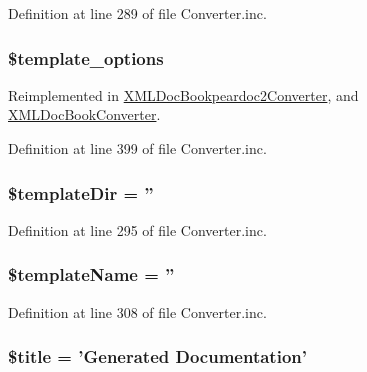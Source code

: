 \-Definition at line 289 of file \-Converter.\-inc.

\hypertarget{class_converter_a9e8e3182b20bb595bfe9186d97b57bb2}{
\subsubsection[{\$template\-\_\-options}]{\setlength{\rightskip}{0pt plus 5cm}\$template\-\_\-options}}\label{class_converter_a9e8e3182b20bb595bfe9186d97b57bb2}


\-Reimplemented in \hyperlink{class_x_m_l_doc_bookpeardoc2_converter_a9e8e3182b20bb595bfe9186d97b57bb2}{\-X\-M\-L\-Doc\-Bookpeardoc2\-Converter}, and \hyperlink{class_x_m_l_doc_book_converter_a9e8e3182b20bb595bfe9186d97b57bb2}{\-X\-M\-L\-Doc\-Book\-Converter}.



\-Definition at line 399 of file \-Converter.\-inc.

\hypertarget{class_converter_a6547ce63e0b4a48fb9414d71c2f64a7c}{
\subsubsection[{\$template\-Dir}]{\setlength{\rightskip}{0pt plus 5cm}\$template\-Dir = ''}}\label{class_converter_a6547ce63e0b4a48fb9414d71c2f64a7c}


\-Definition at line 295 of file \-Converter.\-inc.

\hypertarget{class_converter_a811dd317a408c35d379d08441ad8a982}{
\subsubsection[{\$template\-Name}]{\setlength{\rightskip}{0pt plus 5cm}\$template\-Name = ''}}\label{class_converter_a811dd317a408c35d379d08441ad8a982}


\-Definition at line 308 of file \-Converter.\-inc.

\hypertarget{class_converter_ada57e7bb7c152edad18fe2f166188691}{
\subsubsection[{\$title}]{\setlength{\rightskip}{0pt plus 5cm}\$title = '\-Generated \-Documentation'}}\label{class_converter_ada57e7bb7c152edad18fe2f166188691}


